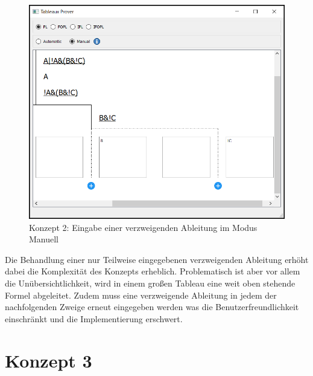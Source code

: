 \begin{figure}[h]
\begin{center}
\includegraphics[scale=0.7]{images/gui_concept_2_manual_enter_branch.png}
\caption{Konzept 2: Eingabe einer verzweigenden Ableitung im Modus Manuell}
\label{fig:gui_concept_2_manual_enter_branch}
\end{center}
\end{figure}

Die Behandlung einer nur Teilweise eingegebenen verzweigenden Ableitung erhöht dabei die Komplexität des Konzepts erheblich. Problematisch ist aber vor allem die Unübersichtlichkeit, wird in einem großen Tableau eine weit oben stehende Formel abgeleitet. Zudem muss eine verzweigende Ableitung in jedem der nachfolgenden Zweige erneut eingegeben werden was die Benutzerfreundlichkeit einschränkt und die Implementierung erschwert.

\section{Konzept 3}

